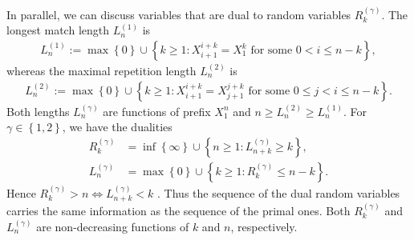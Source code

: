 \documentclass[a4paper,12pt]{article}
\newcommand{\klam}[1]{\left\{ #1 \right\}}
\begin{document}
In parallel, we can discuss variables that are dual to random
variables $R^{(\gamma)}_k$. The longest match length $L^{(1)}_n$ is
\begin{align}
  L^{(1)}_n:=\max\klam{0}\cup\klam{k\ge 1: X_{i+1}^{i+k}=X_1^k
  \text{ for some } 0< i\le n-k},
\end{align}
whereas the maximal repetition length $L^{(2)}_n$ is
\begin{align}
  L^{(2)}_n:=\max\klam{0}\cup\klam{k\ge 1: X_{i+1}^{i+k}=X_{j+1}^{j+k}
  \text{ for some } 0\le j< i\le n-k}.
\end{align}
Both lengths $L^{(\gamma)}_n$ are functions of prefix $X_1^n$ and
$n\ge L^{(2)}_n\ge L^{(1)}_n$. For $\gamma\in\klam{1,2}$, we have the
dualities
\begin{align}
  \label{DualityOne}
  R^{(\gamma)}_k&=\inf\klam{\infty}\cup\klam{n\ge 1: L^{(\gamma)}_{n+k}\ge k},
  \\
  \label{DualityTwo}
  L^{(\gamma)}_n&=\max\klam{0}\cup\klam{k\ge 1: R^{(\gamma)}_k\le n-k}.
\end{align}
Hence $R^{(\gamma)}_k>n\iff L^{(\gamma)}_{n+k}<k$
\citep{WynerZiv89}. Thus the sequence of the dual random variables
carries the same information as the sequence of the primal ones. Both
$R^{(\gamma)}_k$ and $L^{(\gamma)}_n$ are non-decreasing functions of
$k$ and $n$, respectively.
\end{document}
